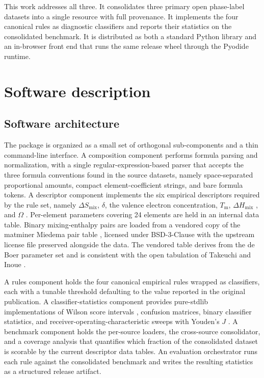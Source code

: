 \documentclass[review,times,nonatbib]{elsarticle}
\newcommand{\Smix}{\ensuremath{\Delta S_{\mathrm{mix}}}}
\newcommand{\Hmix}{\ensuremath{\Delta H_{\mathrm{mix}}}}
\newcommand{\Tm}{\ensuremath{T_{\mathrm{m}}}}
\newcommand{\Omegaparam}{\ensuremath{\Omega}}
\begin{document}
This work addresses all three. It consolidates three primary open
phase-label datasets into a single resource with full provenance.
It implements the four canonical rules as diagnostic classifiers
and reports their statistics on the consolidated benchmark. It is
distributed as both a standard Python library and an in-browser
front end that runs the same release wheel through the Pyodide
runtime.

\section{Software description}

\subsection{Software architecture}

The package is organized as a small set of orthogonal
sub-components and a thin command-line interface. A composition
component performs formula parsing and normalization, with a
single regular-expression-based parser that accepts the three
formula conventions found in the source datasets, namely
space-separated proportional amounts, compact element-coefficient
strings, and bare formula tokens. A descriptor component
implements the six empirical descriptors required by the rule set,
namely $\Smix$, $\delta$, the valence electron concentration,
$\Tm$, $\Hmix$ \cite{miedema1973,miedema1980}, and $\Omegaparam$
\cite{yang2012}. Per-element parameters covering 24 elements are
held in an internal data table. Binary mixing-enthalpy pairs are
loaded from a vendored copy of the matminer Miedema pair table
\cite{ward2018}, licensed under BSD-3-Clause with the upstream
license file preserved alongside the data. The vendored table
derives from the de Boer parameter set \cite{deboer1988} and is
consistent with the open tabulation of Takeuchi and Inoue
\cite{takeuchi2005}.

A rules component holds the four canonical empirical rules wrapped
as classifiers, each with a tunable threshold defaulting to the
value reported in the original publication. A classifier-statistics
component provides pure-stdlib implementations of Wilson score
intervals \cite{wilson1927}, confusion matrices, binary classifier
statistics, and receiver-operating-characteristic sweeps with
Youden's $J$ \cite{youden1950}. A benchmark component holds the
per-source loaders, the cross-source consolidator, and a coverage
analysis that quantifies which fraction of the consolidated dataset
is scorable by the current descriptor data tables. An evaluation
orchestrator runs each rule against the consolidated benchmark and
writes the resulting statistics as a structured release artifact.
\end{document}

